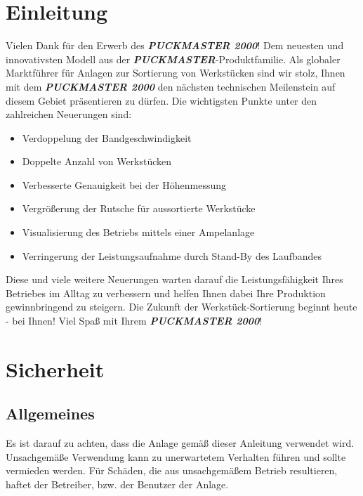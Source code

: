 \documentclass[oneside,a4paper,titlepage]{scrartcl} %
\begin{document}
\newpage

\section{Einleitung}
Vielen Dank für den Erwerb des \textbf{\emph{PUCKMASTER 2000}}!\newline\newline
Dem neuesten und innovativsten Modell aus der \textbf{\emph{PUCKMASTER}}-Produktfamilie.\newline\newline
Als globaler Marktführer für Anlagen zur Sortierung von Werkstücken sind wir stolz, Ihnen mit dem \textbf{\emph{PUCKMASTER 2000}} den nächsten technischen Meilenstein auf diesem Gebiet präsentieren zu dürfen.\newline\newline
Die wichtigsten Punkte unter den zahlreichen Neuerungen sind:\newline
\begin{itemize}
  \item Verdoppelung der Bandgeschwindigkeit
  \item Doppelte Anzahl von Werkstücken
  \item Verbesserte Genauigkeit bei der Höhenmessung
  \item Vergrößerung der Rutsche für aussortierte Werkstücke
  \item Visualisierung des Betriebs mittels einer Ampelanlage
  \item Verringerung der Leistungsaufnahme durch Stand-By des Laufbandes\newline
\end{itemize}
Diese und viele weitere Neuerungen warten darauf die Leistungsfähigkeit Ihres Betriebes im Alltag zu verbessern und helfen Ihnen dabei Ihre Produktion gewinnbringend zu steigern.\newline\newline
Die Zukunft der Werkstück-Sortierung beginnt heute - bei Ihnen!\newline\newline
Viel Spaß mit Ihrem \textbf{\emph{PUCKMASTER 2000}}!

\newpage 

\section{Sicherheit}
\subsection{Allgemeines}
Es ist darauf zu achten, dass die Anlage gemäß dieser Anleitung verwendet wird. Unsachgemäße Verwendung
kann zu unerwartetem Verhalten führen und sollte vermieden werden. Für Schäden, die aus unsachgemäßem Betrieb resultieren, haftet der Betreiber, bzw. der Benutzer der Anlage.
\end{document}
